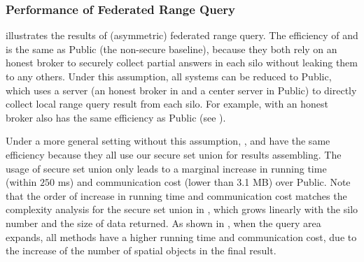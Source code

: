 \subsubsection{Performance of Federated Range Query}
\label{sec:exp-asym-rq}

 illustrates the results of (asymmetric) federated range query.
The efficiency of \smcql and \conclave is the same as Public (\ie the non-secure baseline), because they both rely on an honest broker to securely collect partial answers in each silo without leaking them to any others. Under this assumption, all systems can be reduced to Public, which uses a server (\eg an honest broker in \smcql and a center server in Public) to directly collect local range query result from each silo. For example, \sysname with an honest broker also has the same efficiency as Public (see ). 

Under a more general setting without this assumption, \sysname, \smcqlext and \conclaveext have the same efficiency because they all use our secure set union for results assembling.
The usage of secure set union only leads to a marginal increase in running time (within $250$ ms) and communication cost (lower than 3.1 MB) over Public.
Note that the order of increase in running time and communication cost matches the complexity analysis for the secure set union in , which grows linearly with the silo number and the size of data returned.
As shown in , when the query area expands, all methods have a higher running time and communication cost, due to the increase of the number of spatial objects in the final result.

